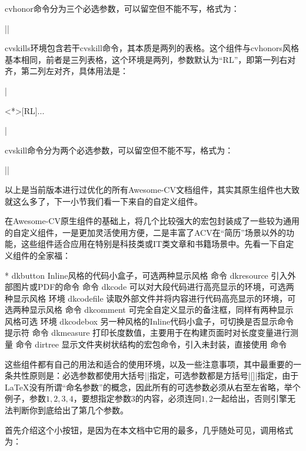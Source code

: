 cvhonor命令分为三个必选参数，可以留空但不能不写，格式为：

||

cvskills环境包含若干cvskill命令，其本质是两列的表格。这个组件与cvhonors风格基本相同，前者是三列表格，这个环境是两列，参数默认为“RL”，即第一列右对齐，第二列左对齐，具体用法是：

|\begin{cvskills}<*>[RL]\cvskill...\end{cvskills}|

cvskill命令分为两个必选参数，可以留空但不能不写，格式为：

||

以上是{\dk}当前版本进行过优化的所有Awesome-CV文档组件，其实其原生组件也大致就这么多了，下一小节我们看一下来自{\dk}的自定义组件。

在Awesome-CV原生组件的基础上，{\dk}将几个比较强大的宏包封装成了一些较为通用的自定义组件，一是更加灵活使用方便，二是丰富了ACV在“简历”场景以外的功能，这些组件适合应用在特别是科技类或IT类文章和书籍场景中。先看一下{\dk}自定义组件的全家福：

\begin{cvhonors}*
  \cvhonor
    {dkbutton}
    {Inline风格的代码小盒子，可选两种显示风格}
    {命令}
  \cvhonor
    {dkresource}
    {引入外部图片或PDF的命令}
    {命令}
  \cvhonor
    {dkcode}
    {可以对大段代码进行高亮显示的环境，可选两种显示风格}
    {环境}
  \cvhonor
    {dkcodefile}
    {读取外部文件并将内容进行代码高亮显示的环境，可选两种显示风格}
    {命令}
  \cvhonor
    {dkcomment}
    {可完全自定义显示的备注框，同样有两种显示风格可选}
    {环境}
  \cvhonor
    {dkcodebox}
    {另一种风格的Inline代码小盒子，可切换是否显示命令提示符}
    {命令}
  \cvhonor
    {dkmeasure}
    {打印长度数值，主要用于在构建页面时对长度变量进行测量}
    {命令}
  \cvhonor
    {dirtree}
    {显示文件夹树状结构的宏包命令，{\dk}引入未封装，直接使用}
    {命令}
\end{cvhonors}

这些组件都有自己的用法和适合的使用环境，以及一些注意事项，其中最重要的一条共性原则是：必选参数都使用大括号|{}|指定，可选参数都是方括号|[]|指定，由于{\LaTeX}没有所谓“命名参数”的概念，因此所有的可选参数必须从右至左省略，举个例子，参数$1,2,3,4$，要想指定参数$3$的内容，必须连同$1,2$一起给出，否则引擎无法判断你到底给出了第几个参数。

首先介绍这个小按钮，是因为在本文档中它用的最多，几乎随处可见，调用格式为：


